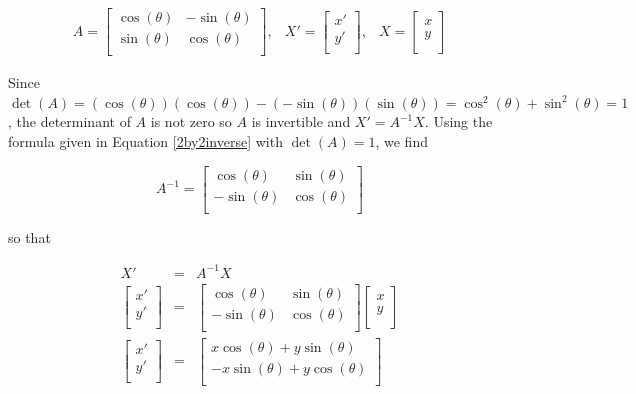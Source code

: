 \documentclass{ximera}
\begin{document}
\[ \begin{array}{ccc}

A = \left[ \begin{array}{rr} \cos(\theta) & -\sin(\theta) \\ \sin(\theta) & \cos(\theta) \\ \end{array} \right], 

&

X'= \left[ \begin{array}{c}x' \\ y'\\ \end{array} \right],

&

X= \left[ \begin{array}{c}x \\ y\\ \end{array} \right]


\end{array} \]

Since $\det(A) = (\cos(\theta))(\cos(\theta)) - (-\sin(\theta))(\sin(\theta)) = \cos^{2}(\theta) + \sin^{2}(\theta) = 1$, the determinant of $A$ is not zero so $A$ is invertible and  $X' = A^{-1}X$.  Using the  formula given in Equation \ref{2by2inverse} with $\det(A) = 1$, we find


\[ A^{-1} = \left[ \begin{array}{rr} \cos(\theta) & \sin(\theta) \\ -\sin(\theta) & \cos(\theta) \\ \end{array} \right] \]

so that

\[ \begin{array}{rcl}

X'& = & A^{-1} X \\  
\left[ \begin{array}{c}x' \\ y'\\ \end{array} \right] & = & \left[ \begin{array}{rr} \cos(\theta) & \sin(\theta) \\ -\sin(\theta) & \cos(\theta) \\ \end{array} \right]\left[ \begin{array}{c}x \\ y\\ \end{array} \right] \\  

\left[ \begin{array}{c}x' \\ y'\\ \end{array} \right] & = & \left[ \begin{array}{c}x \cos(\theta) + y\sin(\theta) \\- x \sin(\theta) + y\cos(\theta)  \\ \end{array} \right] \\ \end{array} \]
\end{document}
